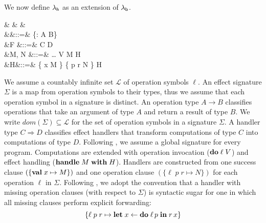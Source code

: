 \documentclass[12pt,phd,lfcs,twoside,openright,logo,leftchapter,normalheadings]{infthesis}
\theoremstyle{plain}
\theoremstyle{definition}
\begin{document}
We now define $\lambda_{\mathsf{h}}$ as an extension of $\lambda_{\mathsf{b}}$.
%
{\small
\begin{syntax}
 &\ell \in {} & & \\
        &\Sigma&::=& \cdot \mid \{\ell : A \to B\} \cup \Sigma\\
     &F     &::=& C \Rightarrow D\\
 &M, N &::=& \dots \mid \Do \; \ell \; V
                          \mid  \Handle \; M \; \With \; H \\
     &H&::=& \{ \Val \; x \mapsto M \}
                      \mid  \{ \ell \; p \; r \mapsto N \} \uplus H\\
\end{syntax}}%
%
We assume a countably infinite set $\mathcal{L}$ of operation symbols
$\ell$.
%
An effect signature $\Sigma$ is a map from operation symbols to their
types, thus we assume that each operation symbol in a signature is
distinct. An operation type $A \to B$ classifies operations that take
an argument of type $A$ and return a result of type $B$.
%
We write $dom(\Sigma) \subseteq \mathcal{L}$ for the set of operation
symbols in a signature $\Sigma$.
%
A handler type $C \Rightarrow D$ classifies effect handlers that
transform computations of type $C$ into computations of type $D$.
%
Following \citet{Pretnar15}, we assume a global signature for every
program.
%
Computations are extended with operation invocation ($\mathbf{do}\;\ell\;V$)
and effect handling ($\mathbf{handle}\; M \;\mathbf{with}\; H$).
%
Handlers are constructed from one success clause $(\{\mathbf{val}\; x \mapsto
M\})$ and one operation clause $(\{ \ell \; p \; r \mapsto N \})$ for
each operation $\ell$ in $\Sigma$.
%
Following \citet{PlotkinP13}, we adopt the convention that a handler
with missing operation clauses (with respect to $\Sigma$) is syntactic
sugar for one in which all missing clauses perform explicit
forwarding:
\[
   \{\ell \; p \; r \mapsto \mathbf{let}\; x \leftarrow \mathbf{do} \; \ell \, p \;\mathbf{in}\; r \, x\}
\]
\end{document}

